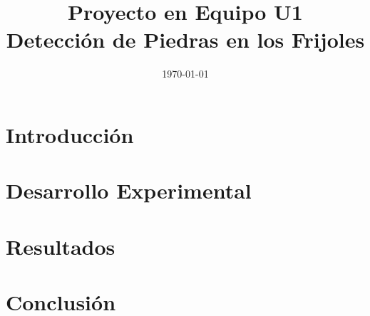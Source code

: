 \documentclass[conference]{IEEEtran}
\date{\specialdate\today}
\begin{document}
\newcommand{\breite}{0.9} %
\newcommand{\RelacionFiguradoscolumnas}{0.9}
\newcommand{\RelacionFiguradoscolumnasPuntoCinco}{0.45}

\title{Proyecto en Equipo U1 \\ Detección de Piedras en los Frijoles}

\author{
}

\maketitle

\begin{abstract} 
    
\end{abstract}

\section{Introducción}
    

\section{Desarrollo Experimental}
    
        

\section{Resultados}
    

\section{Conclusión}
    

\nocite{*}
\printbibliography
\end{document}
